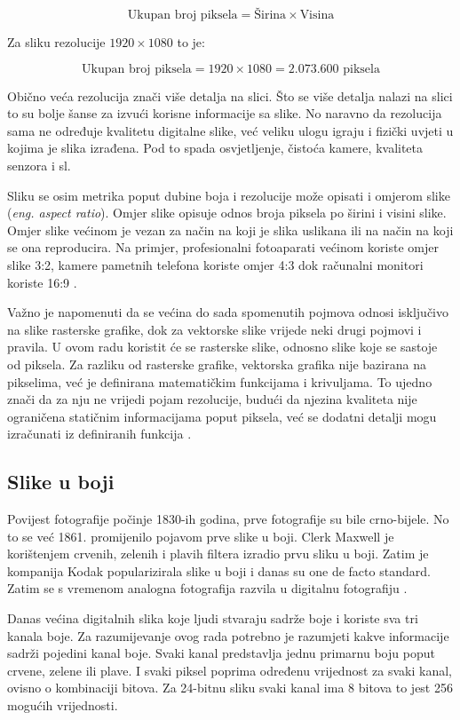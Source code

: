 \documentclass{foi}
\begin{document}
\[
\text{Ukupan broj piksela} = \text{Širina} \times \text{Visina}
\]

Za sliku rezolucije $1920 \times 1080$ to je:

\[
\text{Ukupan broj piksela} = 1920 \times 1080 = 2.073.600 \text{ piksela}
\]

Obično veća rezolucija znači više detalja na slici. Što se više detalja nalazi na slici to su bolje šanse za izvući korisne informacije sa slike. No naravno da rezolucija sama ne određuje kvalitetu digitalne slike, već veliku ulogu igraju i fizički uvjeti u kojima je slika izrađena. Pod to spada osvjetljenje, čistoća kamere, kvaliteta senzora i sl.

Sliku se osim metrika poput dubine boja i rezolucije može opisati i omjerom slike (\textit{eng. aspect ratio}). Omjer slike opisuje odnos broja piksela po širini i visini slike. Omjer slike većinom je vezan za način na koji je slika uslikana ili na način na koji se ona reproducira. Na primjer, profesionalni fotoaparati većinom koriste omjer slike 3:2, kamere pametnih telefona koriste omjer 4:3 dok računalni monitori koriste 16:9 \cite{AspectRatio}.

Važno je napomenuti da se većina do sada spomenutih pojmova odnosi isključivo na slike rasterske grafike, dok za vektorske slike vrijede neki drugi pojmovi i pravila. U ovom radu koristit će se rasterske slike, odnosno slike koje se sastoje od piksela. Za razliku od rasterske grafike, vektorska grafika nije bazirana na pikselima, već je definirana matematičkim funkcijama i krivuljama. To ujedno znači da za nju ne vrijedi pojam rezolucije, budući da njezina kvaliteta nije ograničena statičnim informacijama poput piksela, već se dodatni detalji mogu izračunati iz definiranih funkcija \cite{DigitalnaSlika}.

\subsection{Slike u boji}

Povijest fotografije počinje 1830-ih godina, prve fotografije su bile crno-bijele. No to se već 1861. promijenilo pojavom prve slike u boji. Clerk Maxwell je korištenjem crvenih, zelenih i plavih filtera izradio prvu sliku u boji. Zatim je kompanija Kodak popularizirala slike u boji i danas su one de facto standard. Zatim se s vremenom analogna fotografija razvila u digitalnu fotografiju \cite{ImageHistory}.

Danas većina digitalnih slika koje ljudi stvaraju sadrže boje i koriste sva tri kanala boje. Za razumijevanje ovog rada potrebno je razumjeti kakve informacije sadrži pojedini kanal boje. Svaki kanal predstavlja jednu primarnu boju poput crvene, zelene ili plave. I svaki piksel poprima određenu vrijednost za svaki kanal, ovisno o kombinaciji bitova. Za 24-bitnu sliku svaki kanal ima 8 bitova to jest 256 mogućih vrijednosti. 
\end{document}
